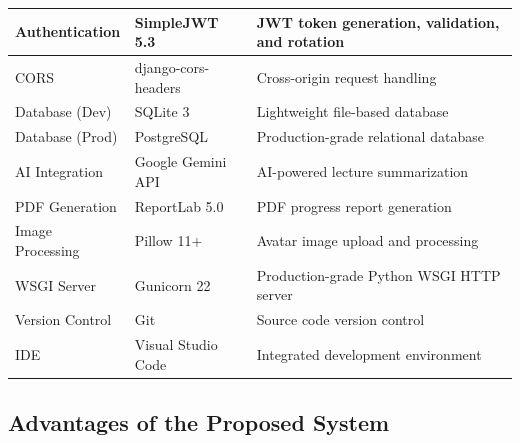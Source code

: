 \begin{table}[H]
\begin{tabular}{|p{3.5cm}|p{3cm}|p{7cm}|}
Authentication & SimpleJWT 5.3 & JWT token generation, validation, and rotation \\
\hline
CORS & django-cors-headers & Cross-origin request handling \\
\hline
Database (Dev) & SQLite 3 & Lightweight file-based database \\
\hline
Database (Prod) & PostgreSQL & Production-grade relational database \\
\hline
AI Integration & Google Gemini API & AI-powered lecture summarization \\
\hline
PDF Generation & ReportLab 5.0 & PDF progress report generation \\
\hline
Image Processing & Pillow 11+ & Avatar image upload and processing \\
\hline
WSGI Server & Gunicorn 22 & Production-grade Python WSGI HTTP server \\
\hline
Version Control & Git & Source code version control \\
\hline
IDE & Visual Studio Code & Integrated development environment \\
\hline
\end{tabular}
\end{table}

\subsection{Advantages of the Proposed System}

